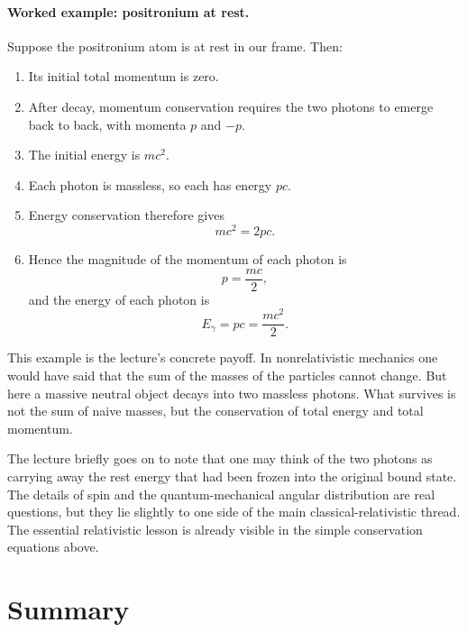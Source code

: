 \paragraph{Worked example: positronium at rest.}
Suppose the positronium atom is at rest in our frame. Then:
\begin{enumerate}
\item Its initial total momentum is zero.
\item After decay, momentum conservation requires the two photons to emerge back to back, with momenta \(p\) and \(-p\).
\item The initial energy is \(mc^2\).
\item Each photon is massless, so each has energy \(pc\).
\item Energy conservation therefore gives
\begin{equation}
mc^2 = 2pc.
\end{equation}
\item Hence the magnitude of the momentum of each photon is
\begin{equation}
p=\frac{mc}{2},
\end{equation}
and the energy of each photon is
\begin{equation}
E_\gamma = pc = \frac{mc^2}{2}.
\end{equation}
\end{enumerate}

This example is the lecture's concrete payoff. In nonrelativistic mechanics one would have said that the sum of the masses of the particles cannot change. But here a massive neutral object decays into two massless photons. What survives is not the sum of naive masses, but the conservation of total energy and total momentum.

The lecture briefly goes on to note that one may think of the two photons as carrying away the rest energy that had been frozen into the original bound state. The details of spin and the quantum-mechanical angular distribution are real questions, but they lie slightly to one side of the main classical-relativistic thread. The essential relativistic lesson is already visible in the simple conservation equations above.

\section{Summary}

